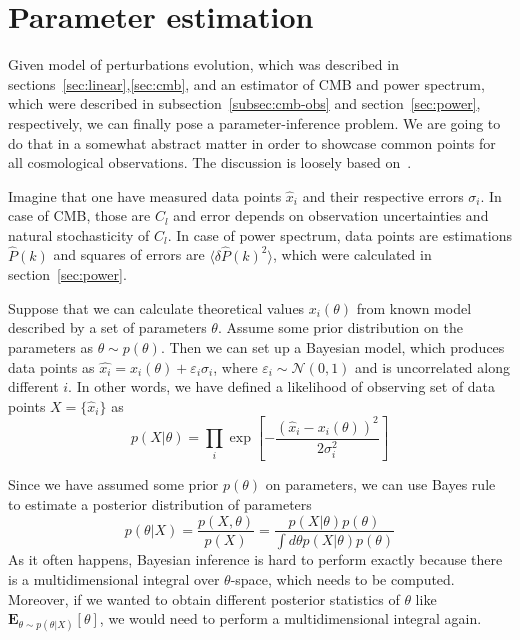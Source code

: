\documentclass[12pt]{extarticle}
\numberwithin{problem}{section}
\numberwithin{theorem}{section}
\begin{document}
	\section{Parameter estimation}
	\label{sec:estimate}
	Given model of perturbations evolution, which was described in sections~\ref{sec:linear},\ref{sec:cmb}, and an estimator of CMB and power spectrum, which were described in subsection~\ref{subsec:cmb-obs} and section~\ref{sec:power}, respectively, we can finally pose a parameter-inference problem. We are going to do that in a somewhat abstract matter in order to showcase common points for all cosmological observations. The discussion is loosely based on~\cite{padilla:2021}.
	
	Imagine that one have measured data points $\hat{x}_i$ and their respective errors $\sigma_i$. In case of CMB, those are $C_l$ and error depends on observation uncertainties and natural stochasticity of $C_l$. In case of power spectrum, data points are estimations $\hat{P}(k)$ and squares of errors are $\langle\delta\hat{P}(k)^2\rangle$, which were calculated in section~\ref{sec:power}. 
	
	Suppose that we can calculate theoretical values $x_i(\theta)$ from known model described by a set of parameters $\theta$. Assume some prior distribution on the parameters as $\theta\sim p(\theta)$. Then we can set up a Bayesian model, which produces data points as $\hat{x_i} = x_i(\theta) + \varepsilon_i\sigma_i$, where $\varepsilon_i\sim\mathcal{N}(0, 1)$ and is uncorrelated along different $i$. In other words, we have defined a likelihood of observing set of data points $X = \{\hat{x}_i\}$ as
	\begin{equation}
		p(X|\theta) = \prod_i \exp\left[-\frac{(\hat{x}_i - x_i(\theta))^2}{2\sigma_i^2}\right]
	\end{equation}

	Since we have assumed some prior $p(\theta)$ on parameters, we can use Bayes rule to estimate a posterior distribution of parameters
	\begin{equation}
		p(\theta|X) = \frac{p(X, \theta)}{p(X)} = \frac{p(X|\theta)p(\theta)}{\int d\theta p(X|\theta)p(\theta)}
	\end{equation}
	As it often happens, Bayesian inference is hard to perform exactly because there is a multidimensional integral over $\theta$-space, which needs to be computed. Moreover, if we wanted to obtain different posterior statistics of $\theta$ like $\mathbf{E}_{\theta\sim p(\theta|X)}[\theta]$, we would need to perform a multidimensional integral again. 
	
\end{document}
